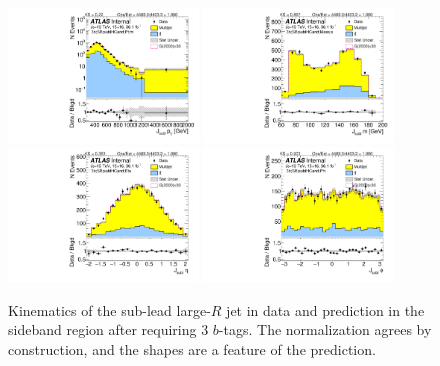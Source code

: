 \begin{figure}[htbp!]
\begin{center}
\includegraphics[width=0.45\textwidth,angle=-90]{figures/boosted/Sideband/b77_ThreeTag_Sideband_sublHCand_Pt_m_1.pdf}
\includegraphics[width=0.45\textwidth,angle=-90]{figures/boosted/Sideband/b77_ThreeTag_Sideband_sublHCand_Mass_s.pdf}\\
\includegraphics[width=0.45\textwidth,angle=-90]{figures/boosted/Sideband/b77_ThreeTag_Sideband_sublHCand_Eta.pdf}
\includegraphics[width=0.45\textwidth,angle=-90]{figures/boosted/Sideband/b77_ThreeTag_Sideband_sublHCand_Phi.pdf}
  \caption{Kinematics of the sub-lead large-$R$ jet in data and prediction in the sideband region after requiring 3 $b$-tags. The normalization agrees by construction, and the shapes are a feature of the prediction.}
  \label{fig:boosted-3b-sideband-ak10-subl}
\end{center}
\end{figure}

